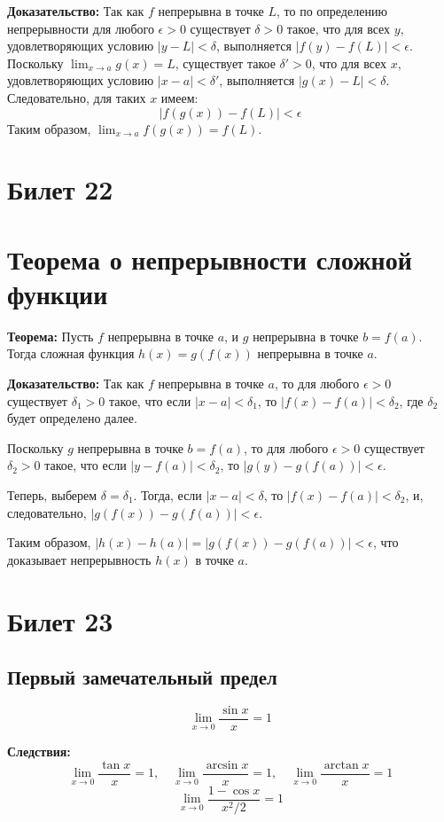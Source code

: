 \documentclass{article}
\begin{document}
\textbf{Доказательство:} Так как $f$ непрерывна в точке $L$, то по определению непрерывности для любого $\epsilon > 0$ существует $\delta > 0$ такое, что для всех $y$, удовлетворяющих условию $|y - L| < \delta$, выполняется $|f(y) - f(L)| < \epsilon$. Поскольку $\lim_{x \to a} g(x) = L$, существует такое $\delta' > 0$, что для всех $x$, удовлетворяющих условию $|x - a| < \delta'$, выполняется $|g(x) - L| < \delta$. Следовательно, для таких $x$ имеем:
\[
|f(g(x)) - f(L)| < \epsilon
\]
Таким образом, $\lim_{x \to a} f(g(x)) = f(L)$.

\section{Билет 22}

\section*{Теорема о непрерывности сложной функции}

\textbf{Теорема:} Пусть $f$ непрерывна в точке $a$, и $g$ непрерывна в точке $b = f(a)$. Тогда сложная функция $h(x) = g(f(x))$ непрерывна в точке $a$.

\textbf{Доказательство:} Так как $f$ непрерывна в точке $a$, то для любого $\epsilon > 0$ существует $\delta_1 > 0$ такое, что если $|x - a| < \delta_1$, то $|f(x) - f(a)| < \delta_2$, где $\delta_2$ будет определено далее.

Поскольку $g$ непрерывна в точке $b = f(a)$, то для любого $\epsilon > 0$ существует $\delta_2 > 0$ такое, что если $|y - f(a)| < \delta_2$, то $|g(y) - g(f(a))| < \epsilon$.

Теперь, выберем $\delta = \delta_1$. Тогда, если $|x - a| < \delta$, то $|f(x) - f(a)| < \delta_2$, и, следовательно, $|g(f(x)) - g(f(a))| < \epsilon$.

Таким образом, $|h(x) - h(a)| = |g(f(x)) - g(f(a))| < \epsilon$, что доказывает непрерывность $h(x)$ в точке $a$.


\section{Билет 23}
\subsection*{Первый замечательный предел}
\[
\lim_{x \to 0} \frac{\sin x}{x} = 1
\]

\textbf{Следствия:}
\[
\lim_{x \to 0} \frac{\tan x}{x} = 1, \quad \lim_{x \to 0} \frac{\arcsin x}{x} = 1, \quad \lim_{x \to 0} \frac{\arctan x}{x} = 1
\]
\[
\lim_{x \to 0} \frac{1 - \cos x}{x^2/2} = 1
\]
\end{document}
